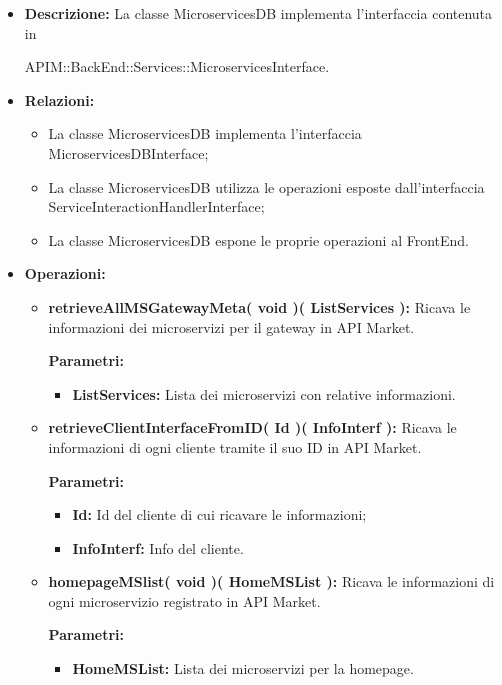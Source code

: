 \begin{itemize}
	\item \textbf{Descrizione:} La classe MicroservicesDB implementa l'interfaccia contenuta in \\
	\begin{minipage} 
		{\linewidth} APIM::BackEnd::Services::MicroservicesInterface.
	\end{minipage}

	\item \textbf{Relazioni:}
		\begin{itemize}
			\item La classe MicroservicesDB implementa l'interfaccia MicroservicesDBInterface;
			\item La classe MicroservicesDB utilizza le operazioni esposte dall'interfaccia ServiceInteractionHandlerInterface;
			\item La classe MicroservicesDB espone le proprie operazioni al FrontEnd.
		\end{itemize}
	\item \textbf{Operazioni:}
		\begin{itemize}
		
			\item \textbf{retrieveAllMSGatewayMeta( void )( ListServices ):} Ricava le informazioni dei microservizi per il gateway in API Market.
			\begin{description}
				\item[\textbf{Parametri:}]
			\end{description}
			\begin{itemize}
				\item \textbf{ListServices:} Lista dei microservizi con relative informazioni.
			\end{itemize}
		
			\item \textbf{retrieveClientInterfaceFromID( Id )( InfoInterf ):} Ricava le informazioni di ogni cliente tramite il suo ID in API Market.
			\begin{description}
				\item[\textbf{Parametri:}]
			\end{description}
			\begin{itemize}
				\item \textbf{Id:} Id del cliente di cui ricavare le informazioni;
				\item \textbf{InfoInterf:} Info del cliente.
			\end{itemize}
		
			\item \textbf{homepageMSlist( void )( HomeMSList ):} Ricava le informazioni di ogni microservizio registrato in API Market.
				\begin{description}
    				\item[\textbf{Parametri:}]
				\end{description}
				\begin{itemize}
					\item \textbf{HomeMSList:} Lista dei microservizi per la homepage.
				\end{itemize}
				

\end{itemize}
\end{itemize}
